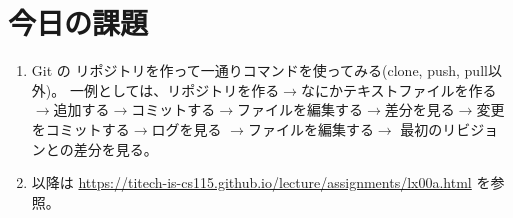 \documentclass[a4paper]{article}
\begin{document}
\section{今日の課題}
\begin{enumerate}
\item Git の リポジトリを作って一通りコマンドを使ってみる(clone, push, pull以外)。
一例としては、リポジトリを作る$\rightarrow$なにかテキストファイルを作る$\rightarrow$追加する$\rightarrow$コミットする$\rightarrow$ファイルを編集する$\rightarrow$差分を見る$\rightarrow$変更をコミットする$\rightarrow$ログを見る
$\rightarrow$ファイルを編集する$\rightarrow$ 最初のリビジョンとの差分を見る。
\item 以降は \url{https://titech-is-cs115.github.io/lecture/assignments/lx00a.html} を参照。
\end{enumerate}
\end{document}
